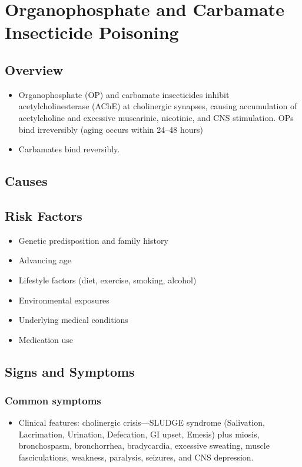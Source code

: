 \chapter{Organophosphate and Carbamate Insecticide Poisoning}
\label{sec:Organophosphate Poisoning}

\section{Overview}


\begin{itemize}[noitemsep]
  \item Organophosphate (OP) and carbamate insecticides inhibit acetylcholinesterase (AChE) at cholinergic synapses, causing accumulation of acetylcholine and excessive muscarinic, nicotinic, and CNS stimulation. OPs bind irreversibly (aging occurs within 24--48 hours)
  \item Carbamates bind reversibly.
\end{itemize}
\section{Causes}
\section{Risk Factors}

\begin{itemize}[noitemsep]
  \item Genetic predisposition and family history
  \item Advancing age
  \item Lifestyle factors (diet, exercise, smoking, alcohol)
  \item Environmental exposures
  \item Underlying medical conditions
  \item Medication use
\end{itemize}
\section{Signs and Symptoms}

\subsection{Common symptoms}
\begin{itemize}[noitemsep]
  \item Clinical features: cholinergic crisis---SLUDGE syndrome (Salivation, Lacrimation, Urination, Defecation, GI upset, Emesis) plus miosis, bronchospasm, bronchorrhea, bradycardia, excessive sweating, muscle fasciculations, weakness, paralysis, seizures, and CNS depression. 
  \end{itemize}


